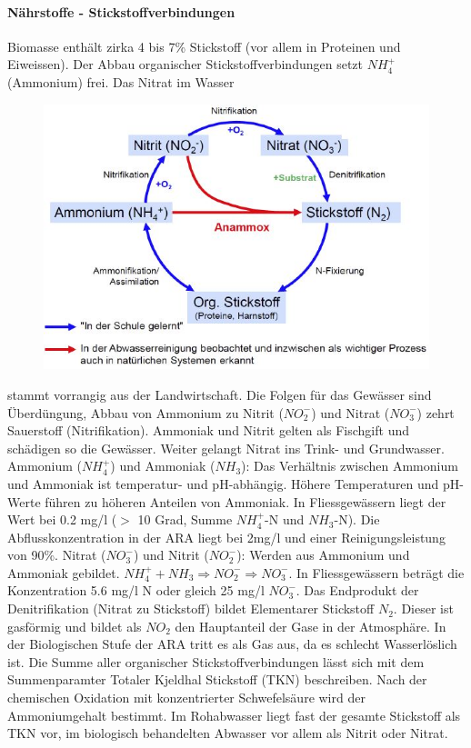 \documentclass[9pt, openright=false]{scrartcl}
\begin{document}
\paragraph{Nährstoffe - Stickstoffverbindungen} Biomasse enthält zirka 4 bis 7\% Stickstoff (vor allem in Proteinen und Eiweissen). Der Abbau organischer Stickstoffverbindungen setzt $NH_4^+$ (Ammonium) frei. Das Nitrat im Wasser\begin{figure} 
  \includegraphics[width=.5\textwidth]{images/Nitrifikation}
\end{figure} stammt  vorrangig aus der Landwirtschaft. Die Folgen für das Gewässer sind Überdüngung, Abbau von Ammonium zu Nitrit ($NO_2^-$) und Nitrat ($NO_3^-$) zehrt Sauerstoff (Nitrifikation). Ammoniak und Nitrit gelten als Fischgift und schädigen so die Gewässer. Weiter gelangt Nitrat ins Trink- und Grundwasser. Ammonium ($NH_4^+$) und Ammoniak ($NH_3$): Das Verhältnis zwischen Ammonium und Ammoniak ist temperatur- und pH-abhängig. Höhere Temperaturen und pH-Werte führen zu höheren Anteilen von Ammoniak. In Fliessgewässern liegt der Wert bei 0.2 mg/l ($>$ 10 Grad, Summe $NH_4^+$-N und $NH_3$-N). Die Abflusskonzentration in der ARA liegt bei 2mg/l und einer Reinigungsleistung von 90\%. Nitrat ($NO_3^-$) und Nitrit ($NO_2^-$): Werden aus Ammonium und Ammoniak gebildet. $NH_4^+ + NH_3 \Rightarrow NO_2^- \Rightarrow  NO_3^-$. In Fliessgewässern beträgt die Konzentration 5.6 mg/l N oder gleich 25 mg/l $NO_3^-$. Das Endprodukt der Denitrifikation (Nitrat zu Stickstoff) bildet Elementarer Stickstoff $N_2$. Dieser ist gasförmig und bildet als $NO_2$ den Hauptanteil der Gase in der Atmosphäre. In der Biologischen Stufe der ARA tritt es als Gas aus, da es schlecht Wasserlöslich ist. Die Summe aller organischer Stickstoffverbindungen lässt sich mit dem Summenparamter Totaler Kjeldhal Stickstoff (TKN) beschreiben. Nach der chemischen Oxidation mit konzentrierter Schwefelsäure wird der Ammoniumgehalt bestimmt. Im Rohabwasser liegt fast der gesamte Stickstoff als TKN vor, im biologisch behandelten Abwasser vor allem als Nitrit oder Nitrat.
\end{document}
